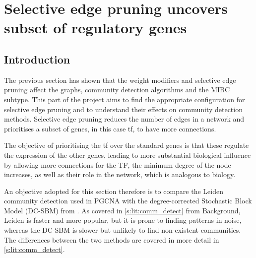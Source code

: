 \chapter{Selective edge pruning uncovers subset of regulatory genes} \label{s:N_I:sel_pruning}
\vspace{3mm}
\vspace{3mm}

\section{Introduction}

The previous section has shown that the weight modifiers and selective edge pruning affect the graphs, community detection algorithms and the MIBC subtype. This part of the project aims to find the appropriate configuration for selective edge pruning and to understand their effects on community detection methods. Selective edge pruning reduces the number of edges in a network and prioritises a subset of genes, in this case \acrfull{tf}, to have more connections.

The objective of prioritising the \acrshort{tf} over the standard genes is that these regulate the expression of the other genes, leading to more substantial biological influence by allowing more connections for the TF, the minimum degree of the node increases, as well as their role in the network, which is analogous to biology. 

An objective adopted for this section therefore is to compare the Leiden \citep{Traag2019-ne} community detection used in PGCNA with the degree-corrected Stochastic Block Model (DC-SBM) from \citep{Karrer2011-si, Peixoto2017-gc}. As covered in \cref{s:lit:comm_detect} from Background, Leiden is faster and more popular, but it is prone to finding patterns in noise, whereas the DC-SBM is slower but unlikely to find non-existent communities. The differences between the two methods are covered in more detail in \cref{s:lit:comm_detect}.


